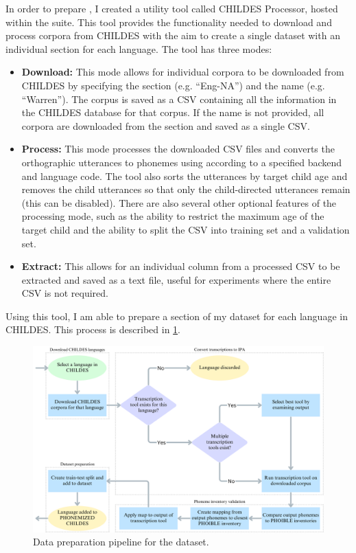 In order to prepare \phonemizedchildes, I created a utility tool called CHILDES Processor, hosted within the \corpusphonemizer suite. This tool provides the functionality needed to download and process corpora from CHILDES with the aim to create a single dataset with an individual section for each language. The tool has three modes:
\begin{itemize}
\item \textbf{Download:} This mode allows for individual corpora to be downloaded from CHILDES by specifying the section (e.g. ``Eng-NA'') and the name (e.g. ``Warren''). The corpus is saved as a CSV containing all the information in the CHILDES database for that corpus. If the name is not provided, all corpora are downloaded from the section and saved as a single CSV.
\item\textbf{Process:} This mode processes the downloaded CSV files and converts the orthographic utterances to phonemes using \corpusphonemizer according to a specified backend and language code. The tool also sorts the utterances by target child age and removes the child utterances so that only the child-directed utterances remain (this can be disabled). There are also several other optional features of the processing mode, such as the ability to restrict the maximum age of the target child and the ability to split the CSV into training set and a validation set.
\item\textbf{Extract:} This allows for an individual column from a processed CSV to be extracted and saved as a text file, useful for experiments where the entire CSV is not required.
\end{itemize}

Using this tool, I am able to prepare a section of my dataset for each language in CHILDES. This process is described in \cref{fig:dataset-phonemized-childes-prep}.

\begin{figure}[ht]
    \centering
    \includegraphics[width=0.9\linewidth]{Figures/13Dataset/data-prep.png}
    \caption{Data preparation pipeline for the \phonemizedchildes dataset.}
    \label{fig:dataset-phonemized-childes-prep}
\end{figure}

